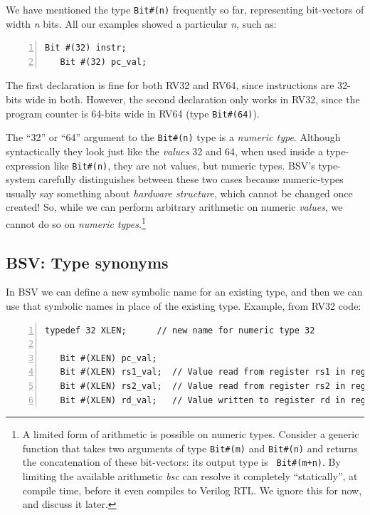 \label{BSV_Numeric_types}

We have mentioned the type \verb|Bit#(n)| frequently so far,
representing bit-vectors of width \emph{n} bits.  All our examples
showed a particular \emph{n}, such as:

\begin{Verbatim}[frame=single, numbers=left]
   Bit #(32) instr;
   Bit #(32) pc_val;
\end{Verbatim}

The first declaration is fine for both RV32 and RV64, since
instructions are 32-bits wide in both.  However, the second
declaration only works in RV32, since the program counter is 64-bits
wide in RV64 (type \verb|Bit#(64)|).

\label{BSV_numeric_types}

The ``32'' or ``64'' argument to the \verb|Bit#(n)| type is a
\emph{numeric type}.  Although syntactically they look just like the
\emph{values} 32 and 64, when used inside a type-expression like
\verb|Bit#(n)|, they are not values, but numeric types.  BSV's
type-system carefully distinguishes between these two cases because
numeric-types usually say something about \emph{hardware structure},
which cannot be changed once created!  So, while we can perform
arbitrary arithmetic on numeric \emph{values}, we cannot do so on
\emph{numeric types}.\footnote{A limited form of arithmetic is
possible on numeric types.  Consider a generic function that takes two
arguments of type {\tt Bit\#(m)} and {\tt Bit\#(n)} and returns the
concatenation of these bit-vectors: its output type is {\tt
Bit\#(m+n)}.  By limiting the available arithmetic \emph{bsc} can
resolve it completely ``statically'', {\ie} at compile time, before it
even compiles to Verilog RTL.  We ignore this for now, and discuss it
later.}


\subsection{BSV: Type synonyms}

\label{BSV_Type_synonyms}


In BSV we can define a new symbolic name for an existing type, and
then we can use that symbolic names in place of the existing
type. Example, from RV32 code:

\begin{Verbatim}[frame=single, numbers=left]
   typedef 32 XLEN;      // new name for numeric type 32

   Bit #(XLEN) pc_val;
   Bit #(XLEN) rs1_val;  // Value read from register rs1 in register file
   Bit #(XLEN) rs2_val;  // Value read from register rs2 in register file
   Bit #(XLEN) rd_val;   // Value written to register rd in register file
\end{Verbatim}

